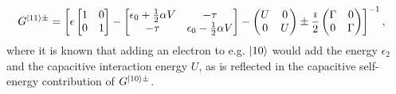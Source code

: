 \begin{align*}
G^{\ket{11}\pm} &= \left[ \epsilon \begin{bmatrix} 1 & 0 \\ 0 & 1 \end{bmatrix} - \begin{bmatrix} \epsilon_0 + \frac{1}{2} \alpha V & -\tau \\
-\tau & \epsilon_0 - \frac{1}{2} \alpha V\end{bmatrix} - \begin{pmatrix} U & 0 \\ 0 & U \end{pmatrix} \pm \frac{\imath}{2} \begin{pmatrix} \Gamma & 0 \\ 0 & \Gamma \end{pmatrix} \right]^{-1},
\end{align*}
where it is known that adding an electron to e.g. $\ket{10}$ would add the energy $\epsilon_2$ and the capacitive interaction energy $U$, as is reflected in the capacitive self-energy contribution of $G^{\ket{10}\pm}$. 

